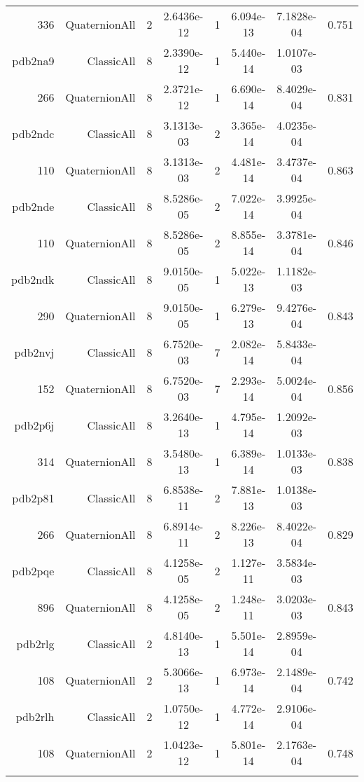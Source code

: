\begin{xltabular}{\textwidth}{r|rcS[table-format=1.4e+2]cS[table-format=1.3e+2]S[table-format=1.4e+2]S[table-format=-1.3]}
336 & QuaternionAll & 2 & 2.6436e-12 & 1 & 6.094e-13 & 7.1828e-04 & 0.751\\  \addlinespace
pdb2na9 & ClassicAll & 8 & 2.3390e-12 & 1 & 5.440e-14 & 1.0107e-03 & \\
266 & QuaternionAll & 8 & 2.3721e-12 & 1 & 6.690e-14 & 8.4029e-04 & 0.831\\  \addlinespace
pdb2ndc & ClassicAll & 8 & 3.1313e-03 & 2 & 3.365e-14 & 4.0235e-04 & \\
110 & QuaternionAll & 8 & 3.1313e-03 & 2 & 4.481e-14 & 3.4737e-04 & 0.863\\  \addlinespace
pdb2nde & ClassicAll & 8 & 8.5286e-05 & 2 & 7.022e-14 & 3.9925e-04 & \\
110 & QuaternionAll & 8 & 8.5286e-05 & 2 & 8.855e-14 & 3.3781e-04 & 0.846\\  \addlinespace
pdb2ndk & ClassicAll & 8 & 9.0150e-05 & 1 & 5.022e-13 & 1.1182e-03 & \\
290 & QuaternionAll & 8 & 9.0150e-05 & 1 & 6.279e-13 & 9.4276e-04 & 0.843\\  \addlinespace
pdb2nvj & ClassicAll & 8 & 6.7520e-03 & 7 & 2.082e-14 & 5.8433e-04 & \\
152 & QuaternionAll & 8 & 6.7520e-03 & 7 & 2.293e-14 & 5.0024e-04 & 0.856\\  \addlinespace
pdb2p6j & ClassicAll & 8 & 3.2640e-13 & 1 & 4.795e-14 & 1.2092e-03 & \\
314 & QuaternionAll & 8 & 3.5480e-13 & 1 & 6.389e-14 & 1.0133e-03 & 0.838\\  \addlinespace
pdb2p81 & ClassicAll & 8 & 6.8538e-11 & 2 & 7.881e-13 & 1.0138e-03 & \\
266 & QuaternionAll & 8 & 6.8914e-11 & 2 & 8.226e-13 & 8.4022e-04 & 0.829\\  \addlinespace
pdb2pqe & ClassicAll & 8 & 4.1258e-05 & 2 & 1.127e-11 & 3.5834e-03 & \\
896 & QuaternionAll & 8 & 4.1258e-05 & 2 & 1.248e-11 & 3.0203e-03 & 0.843\\  \addlinespace
pdb2rlg & ClassicAll & 2 & 4.8140e-13 & 1 & 5.501e-14 & 2.8959e-04 & \\
108 & QuaternionAll & 2 & 5.3066e-13 & 1 & 6.973e-14 & 2.1489e-04 & 0.742\\  \addlinespace
pdb2rlh & ClassicAll & 2 & 1.0750e-12 & 1 & 4.772e-14 & 2.9106e-04 & \\
108 & QuaternionAll & 2 & 1.0423e-12 & 1 & 5.801e-14 & 2.1763e-04 & 0.748\\  \addlinespace

\end{xltabular}
